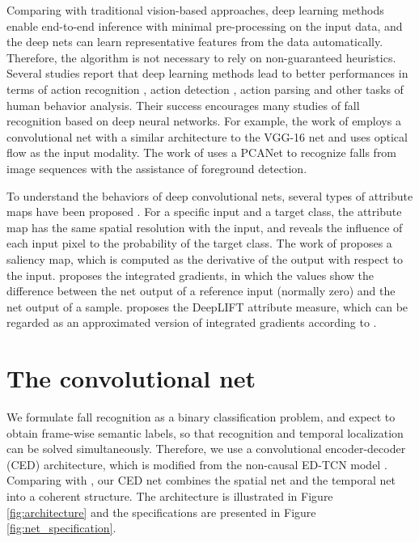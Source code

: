 \documentclass[runningheads]{llncs}
\begin{document}
Comparing with traditional vision-based approaches, deep learning methods enable end-to-end inference with minimal pre-processing on the input data, and the deep nets can learn representative features from the data automatically. Therefore, the algorithm is not necessary to rely on non-guaranteed heuristics. Several studies report that deep learning methods lead to better performances in terms of action recognition \cite{simonyan2014two} \cite{Carreira_2017_CVPR}, action detection \cite{yeung2016end} \cite{gkioxari2015finding} \cite{shou2017cdc}, action parsing \cite{Lea_2017_CVPR} \cite{lea2016temporal} and other tasks of human behavior analysis. Their success encourages many studies of fall recognition based on deep neural networks. For example, the work of \cite{nunez2017vision} employs a convolutional net with a similar architecture to the VGG-16 net \cite{simonyan2014very} and uses optical flow as the input modality. The work of \cite{wang2016human} uses a PCANet to recognize falls from image sequences with the assistance of foreground detection. 


To understand the behaviors of deep convolutional nets, several types of attribute maps have been proposed \cite{babiker2017introduction} \cite{ancona2017unified}. For a specific input and a target class, the attribute map has the same spatial resolution with the input, and reveals the influence of each input pixel to the probability of the target class. The work of \cite{simonyan2013deep} proposes a saliency map, which is computed as the derivative of the output with respect to the input. \cite{sundararajan2017axiomatic} proposes the {integrated gradients}, in which the values show the difference between the net output of a reference input (normally zero) and the net output of a sample. \cite{shrikumar2017learning} proposes the DeepLIFT attribute measure, which can be regarded as an approximated version of {integrated gradients} according to \cite{ancona2017unified}. 




\section{The convolutional net}
\label{sec:methods}


We formulate fall recognition as a binary classification problem, and expect to obtain frame-wise semantic labels, so that recognition and temporal localization can be solved simultaneously. Therefore, we use a convolutional encoder-decoder (CED) architecture, which is modified from the non-causal ED-TCN model \cite{Lea_2017_CVPR}. Comparing with \cite{Lea_2017_CVPR}, our CED net combines the spatial net and the temporal net into a coherent structure. The architecture is illustrated in Figure \ref{fig:architecture} and the specifications are presented in Figure \ref{fig:net_specification}.
\end{document}
